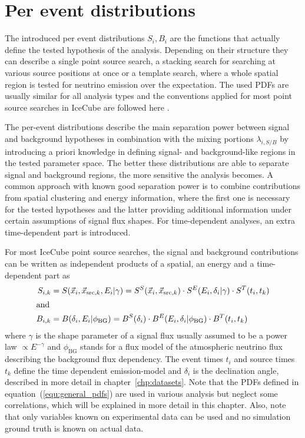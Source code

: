 \section{Per event distributions}
The introduced per event distributions $S_i, B_i$ are the functions that actually define the tested hypothesis of the analysis.
Depending on their structure they can describe a single point source search, a stacking search for searching at various source positions at once or a template search, where a whole spatial region is tested for neutrino emission over the expectation.
The used PDFs are usually similar for all analysis types and the conventions applied for most point source searches in IceCube are followed here .

The per-event distributions describe the main separation power between signal and background hypotheses in combination with the mixing portions $\lambda_{i,S/B}$ by introducing a priori knowledge in defining signal- and background-like regions in the tested parameter space.
The better these distributions are able to separate signal and background regions, the more sensitive the analysis becomes.
A common approach with known good separation power is to combine contributions from spatial clustering and energy information, where the first one is necessary for the tested hypotheses and the latter providing additional information under certain assumptions of signal flux shapes.
For time-dependent analyses, an extra time-dependent part is introduced.

For most IceCube point source searches, the signal and background contributions can be written as independent products of a spatial, an energy and a time-dependent part as
\begin{align}
  \label{equ:general_pdfs}
  S_{i,k}
    &= S(\vec{x}_i, \vec{x}_{\mathrm{src},k}, E_i | \gamma)
     = S^S(\vec{x}_i, \vec{x}_{\mathrm{src},k}) \cdot
       S^E(E_i, \delta_i | \gamma) \cdot
       S^T(t_i, t_k) \\
  \intertext{and}
  B_{i,k}
    &= B(\delta_i, E_i | \phi_\mathrm{BG})
     = B^S(\delta_i) \cdot
       B^E(E_i, \delta_i | \phi_\mathrm{BG}) \cdot
       B^T(t_i, t_k)
\end{align}
where $\gamma$ is the shape parameter of a signal flux usually assumed to be a power law $\propto E^{-\gamma}$ and $\phi_\mathrm{BG}$ stands for a flux model of the atmospheric neutrino flux describing the background flux dependency.
The event times $t_i$ and source times $t_k$ define the time dependent emission-model and $\delta_i$ is the declination angle, described in more detail in chapter~\ref{chp:datasets}.
Note that the PDFs defined in equation~(\ref{equ:general_pdfs}) are used in various analysis but neglect some correlations, which will be explained in more detail in this chapter.
Also, note that only variables known on experimental data can be used and no simulation ground truth is known on actual data.

